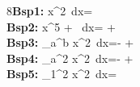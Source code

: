 \documentclass[12pt]{article}
\begin{document}
8{\bf Bsp1:}
\int x^{2}\, dx= \\

{\bf Bsp2:}
\int x^{5} + \, dx= +  \\

{\bf Bsp3:}
\int_{a}^{b} x^{2}\, dx=-  +  \\

{\bf Bsp4:}
\int_{a}^{2} x^{2}\, dx=-  +  \\

{\bf Bsp5:}
\int_{1}^{2} x^{2}\, dx= \\
\end{document}

